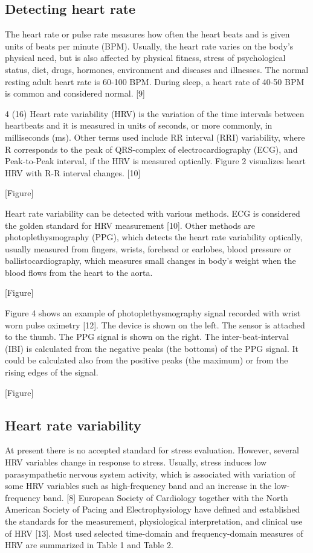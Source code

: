 \documentclass{article}
\begin{document}
\subsection{Detecting heart rate}
The heart rate or pulse rate measures how often the heart beats and is given units of beats
per minute (BPM). Usually, the heart rate varies on the body’s physical need, but is also
affected by physical fitness, stress of psychological status, diet, drugs, hormones,
environment and diseases and illnesses. The normal resting adult heart rate is 60-100 BPM.
During sleep, a heart rate of 40-50 BPM is common and considered normal. [9]

4 (16)
Heart rate variability (HRV) is the variation of the time intervals between heartbeats and it is
measured in units of seconds, or more commonly, in milliseconds (ms). Other terms used
include RR interval (RRI) variability, where R corresponds to the peak of QRS-complex of
electrocardiography (ECG), and Peak-to-Peak interval, if the HRV is measured optically.
Figure 2 visualizes heart HRV with R-R interval changes. [10]

[Figure]

Heart rate variability can be detected with various methods. ECG is considered the golden
standard for HRV measurement [10]. Other methods are photoplethysmography (PPG),
which detects the heart rate variability optically, usually measured from fingers, wrists,
forehead or earlobes, blood pressure or ballistocardiography, which measures small
changes in body’s weight when the blood flows from the heart to the aorta.

[Figure]

Figure 4 shows an example of photoplethysmography signal recorded with wrist worn pulse
oximetry [12]. The device is shown on the left. The sensor is attached to the thumb. The
PPG signal is shown on the right. The inter-beat-interval (IBI) is calculated from the negative
peaks (the bottoms) of the PPG signal. It could be calculated also from the positive peaks
(the maximum) or from the rising edges of the signal.

[Figure]

\subsection{Heart rate variability}
At present there is no accepted standard for stress evaluation. However, several HRV
variables change in response to stress. Usually, stress induces low parasympathetic
nervous system activity, which is associated with variation of some HRV variables such as
high-frequency band and an increase in the low-frequency band. [8]
European Society of Cardiology together with the North American Society of Pacing and
Electrophysiology have defined and established the standards for the measurement,
physiological interpretation, and clinical use of HRV [13]. Most used selected time-domain
and frequency-domain measures of HRV are summarized in Table 1 and Table 2.
\end{document}
